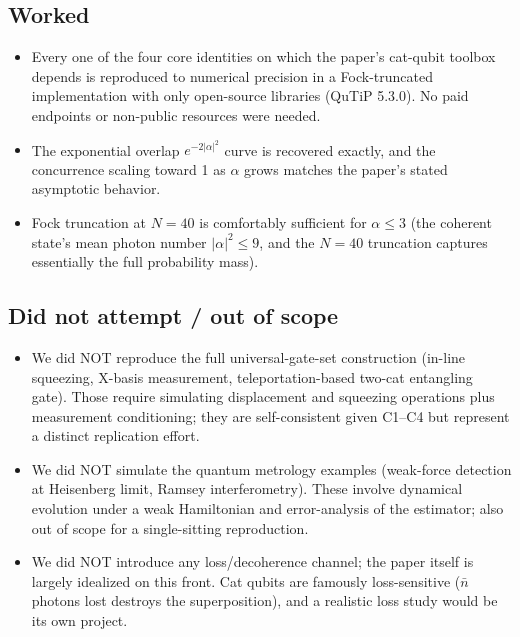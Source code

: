 \documentclass[11pt,letterpaper]{article}
\begin{document}
\subsection*{Worked}
\begin{itemize}
  \item Every one of the four core identities on which the paper's
        cat-qubit toolbox depends is reproduced to numerical precision
        in a Fock-truncated implementation with only open-source
        libraries (QuTiP 5.3.0). No paid endpoints or non-public
        resources were needed.
  \item The exponential overlap $e^{-2|\alpha|^2}$ curve is recovered
        exactly, and the concurrence scaling toward 1 as $\alpha$
        grows matches the paper's stated asymptotic behavior.
  \item Fock truncation at $N=40$ is comfortably sufficient for
        $\alpha \le 3$ (the coherent state's mean photon number
        $|\alpha|^2 \le 9$, and the $N=40$ truncation captures
        essentially the full probability mass).
\end{itemize}

\subsection*{Did not attempt / out of scope}
\begin{itemize}
  \item We did NOT reproduce the full universal-gate-set construction
        (in-line squeezing, X-basis measurement, teleportation-based
        two-cat entangling gate). Those require simulating displacement
        and squeezing operations plus measurement conditioning; they
        are self-consistent given C1--C4 but represent a distinct
        replication effort.
  \item We did NOT simulate the quantum metrology examples
        (weak-force detection at Heisenberg limit, Ramsey
        interferometry). These involve dynamical evolution under a
        weak Hamiltonian and error-analysis of the estimator; also
        out of scope for a single-sitting reproduction.
  \item We did NOT introduce any loss/decoherence channel; the paper
        itself is largely idealized on this front. Cat qubits are
        famously loss-sensitive ($\bar n$ photons lost destroys the
        superposition), and a realistic loss study would be its own
        project.
\end{itemize}
\end{document}
